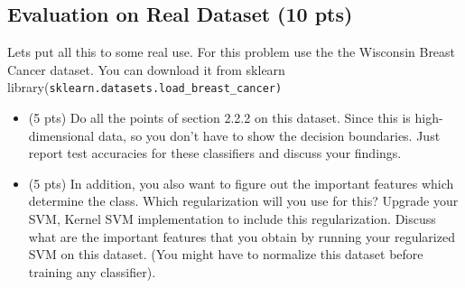 \documentclass[a4paper]{article}
\theoremstyle{definition}
\begin{document}
 \subsection{Evaluation on Real Dataset (10 pts)}
 Lets put all this to some real use. For this problem use the the Wisconsin Breast Cancer dataset. You can download it from sklearn library(\texttt{sklearn.datasets.load\_breast\_cancer)
}
\begin{itemize}
    \item (5 pts) Do all the points of section 2.2.2 on this dataset. Since this is high-dimensional data, so you don't have to show the decision boundaries. Just report test accuracies for these classifiers and discuss your findings. 
    
    \item (5 pts) In addition, you also want to figure out the  important features which determine the class. Which regularization will you use for this? Upgrade your SVM, Kernel SVM implementation to include this regularization. Discuss what are the important features that you obtain by running your regularized SVM on this dataset. (You might have to normalize this dataset before training any classifier).
\end{itemize}
\end{document}
